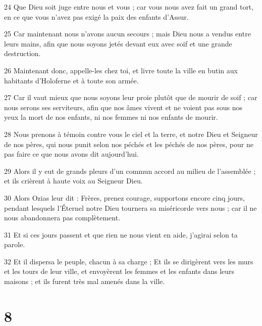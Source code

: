\par 24 Que Dieu soit juge entre nous et vous ; car vous nous avez fait un grand tort, en ce que vous n'avez pas exigé la paix des enfants d'Assur.
\par 25 Car maintenant nous n'avons aucun secours ; mais Dieu nous a vendus entre leurs mains, afin que nous soyons jetés devant eux avec soif et une grande destruction.
\par 26 Maintenant donc, appelle-les chez toi, et livre toute la ville en butin aux habitants d'Holoferne et à toute son armée.
\par 27 Car il vaut mieux que nous soyons leur proie plutôt que de mourir de soif ; car nous serons ses serviteurs, afin que nos âmes vivent et ne voient pas sous nos yeux la mort de nos enfants, ni nos femmes ni nos enfants de mourir.
\par 28 Nous prenons à témoin contre vous le ciel et la terre, et notre Dieu et Seigneur de nos pères, qui nous punit selon nos péchés et les péchés de nos pères, pour ne pas faire ce que nous avons dit aujourd'hui.
\par 29 Alors il y eut de grands pleurs d'un commun accord au milieu de l'assemblée ; et ils crièrent à haute voix au Seigneur Dieu.
\par 30 Alors Ozias leur dit : Frères, prenez courage, supportons encore cinq jours, pendant lesquels l'Éternel notre Dieu tournera sa miséricorde vers nous ; car il ne nous abandonnera pas complètement.
\par 31 Et si ces jours passent et que rien ne nous vient en aide, j'agirai selon ta parole.
\par 32 Et il dispersa le peuple, chacun à sa charge ; Et ils se dirigèrent vers les murs et les tours de leur ville, et envoyèrent les femmes et les enfants dans leurs maisons ; et ils furent très mal amenés dans la ville.

\chapter{8}

